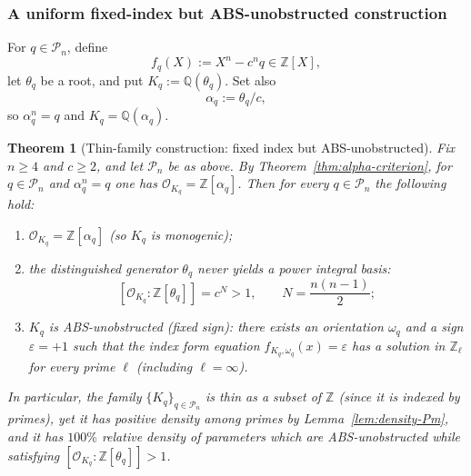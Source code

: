 \documentclass[11pt,letterpaper]{amsart}
\newcommand{\Z}{\mathbb{Z}}
\newcommand{\Q}{\mathbb{Q}}
\newcommand{\Ocal}{\mathcal{O}}
\theoremstyle{plain}
\newtheorem{theorem}{Theorem}[section]
\theoremstyle{definition}
\theoremstyle{remark}
\theoremstyle{plain}
\begin{document}
\subsubsection{A uniform fixed-index but \textsc{ABS}-unobstructed construction}

For $q\in\mathcal P_n$, define
\[
f_q(X):=X^n-c^n q\in\Z[X],
\]
let $\theta_q$ be a root, and put $K_q:=\Q(\theta_q)$.
Set also
\[
\alpha_q:=\theta_q/c,
\]
so $\alpha_q^n=q$ and $K_q=\Q(\alpha_q)$.

\begin{theorem}[Thin-family construction: fixed index but \textsc{ABS}-unobstructed]
\label{thm:thin-counterexample}
Fix $n\ge 4$ and $c\ge 2$, and let $\mathcal P_n$ be as above.
By Theorem~\ref{thm:alpha-criterion}, for $q\in\mathcal P_n$ and $\alpha_q^n=q$ one has $\Ocal_{K_q}=\Z[\alpha_q]$.
Then for every $q\in\mathcal P_n$ the following hold:
\begin{enumerate}[label=\textup{(\roman*)}]
\item $\Ocal_{K_q}=\Z[\alpha_q]$ (so $K_q$ is monogenic);
\item the distinguished generator $\theta_q$ never yields a power integral basis:
\[
[\Ocal_{K_q}:\Z[\theta_q]]=c^N>1,
\qquad
N=\frac{n(n-1)}2;
\]
\item $K_q$ is \textsc{ABS}-unobstructed (fixed sign): there exists an orientation $\omega_q$ and a sign
$\varepsilon=+1$ such that the index form equation $f_{K_q,\omega_q}(x)=\varepsilon$ has a solution in $\Z_\ell$
for every prime $\ell$ (including $\ell=\infty$).
\end{enumerate}
In particular, the family $\{K_q\}_{q\in\mathcal P_n}$ is thin as a subset of $\Z$ (since it is indexed by primes),
yet it has positive density among primes by Lemma~\ref{lem:density-Pm}, and it has $100\%$ relative density
of parameters which are \textsc{ABS}-unobstructed while satisfying $[\Ocal_{K_q}:\Z[\theta_q]]>1$.
\end{theorem}
\end{document}

